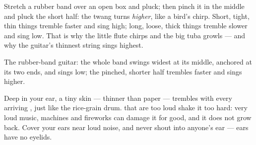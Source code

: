 \begin{example}\label{ex:g3:sound-around-us:pitch}
Stretch a rubber band over an open box and pluck; then pinch it in
the middle and pluck the short half: the twang turns \emph{higher},
like a bird's chirp. Short, tight, thin things tremble faster and
sing high; long, loose, thick things tremble slower and sing low.
That is why the little flute chirps and the big tuba growls --- and
why the guitar's thinnest string sings highest.
\end{example}

\begin{omfigure}

{\small The rubber-band guitar: the whole band swings widest at its
middle, anchored at its two ends, and sings low; the pinched,
shorter half trembles faster and sings higher.}
\end{omfigure}

\begin{remark}\label{rem:g3:sound-around-us:ears}
Deep in your ear, a tiny skin --- thinner than paper --- trembles
with every arriving , just like the rice-grain drum. 
that are too loud shake it too hard: very loud music, machines and
fireworks can damage it for good, and it does not grow back. Cover
your ears near loud noise, and never shout into anyone's ear ---
ears have no eyelids.
\end{remark}

